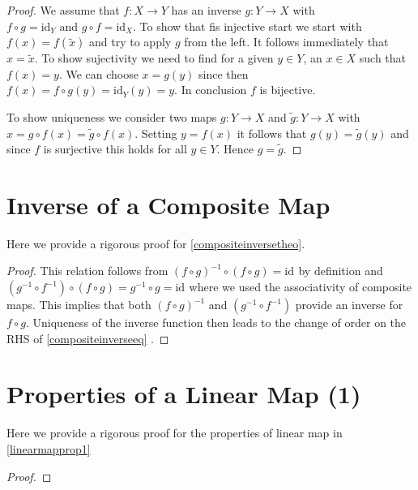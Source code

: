 \documentclass[a4paper,12pt]{report}
\begin{document}
\begin{appendices}
\begin{proof}
    We assume that \(f:X \rightarrow Y\) has an inverse \(g:Y \rightarrow X\) with \(f \circ g = \mathrm{id}_{Y} \text { and } g \circ f = \mathrm{id}_{X}  \). To show that fis injective start we start with \(f(x) = f(\tilde{x} )\) and try to apply \(g\) from the left. It follows immediately that \(x=\tilde{x} \). To show sujectivity we need to find for a given \(y \in  Y\), an \(x \in  X\) such that \(f(x) = y\). We can choose \(x = g(y)\) since then \(f(x) = f \circ g(y) = \mathrm{id}_{Y}(y)  = y \). In conclusion \(f\) is bijective.
    
    To show uniqueness we consider two maps \(g:Y \rightarrow X\) and \(\tilde{g} : Y \rightarrow X\) with \(x= g \circ f(x) = \tilde{g} \circ f(x)\). Setting \(y = f(x)\) it follows that \(g(y) = \tilde{g} (y)\) and since \(f\) is surjective this holds for all \(y \in  Y\). Hence \(g=\tilde{g} \).       
\end{proof}

\section{Inverse of a Composite Map} \label{compositeinverseapp} 

Here we provide a rigorous proof for \cref{compositeinversetheo}.

\begin{proof}
    This relation follows from \((f \circ g)^{-1} \circ (f \circ g) = \mathrm{id}_{}  \) by definition and \((g^{-1} \circ f^{-1} )\circ (f \circ g)= g^{-1} \circ g = \mathrm{id}_{} \) where we used the associativity of composite maps. This implies that both \((f \circ  g)^{-1} \text { and } (g^{-1} \circ f^{-1} )\) provide an inverse for \(f \circ  g\). Uniqueness of the inverse function then leads to the change of order on the RHS of \cref{compositeinverseeq} .
\end{proof}

\section{Properties of a Linear Map (1)} \label{linearmapprop1app}

Here we provide a rigorous proof for the properties of linear map in \cref{linearmapprop1}

\begin{proof}


\end{proof}
\end{appendices}
\end{document}
